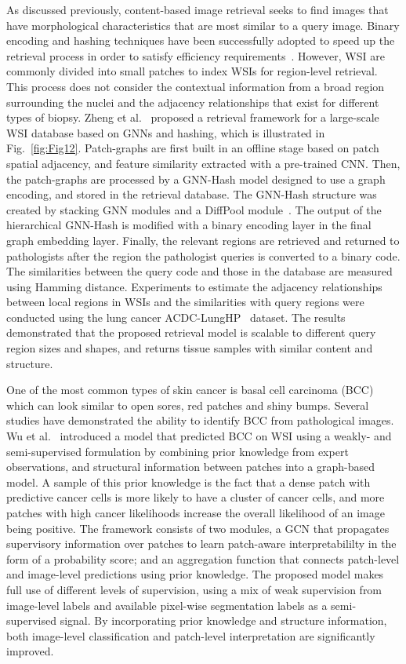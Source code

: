 As discussed previously, content-based image retrieval seeks to find images that have morphological characteristics that are most similar to a query image.
Binary encoding and hashing techniques have been successfully adopted to speed up the retrieval process in order to satisfy efficiency requirements~. However, WSI are commonly divided into small patches to index WSIs for region-level retrieval. This process does not consider the contextual information from a broad region surrounding the nuclei and the adjacency relationships that exist for different types of biopsy.
Zheng et al.~ proposed a retrieval framework for a large-scale WSI database based on GNNs and hashing, which is illustrated in Fig.~\ref{fig:Fig12}.
Patch-graphs are first built in an offline stage based on patch spatial adjacency, and feature similarity extracted with a pre-trained CNN. Then, the patch-graphs are processed by a GNN-Hash model designed to use a graph encoding, and stored in the retrieval database. The GNN-Hash structure was created by stacking GNN modules and a DiffPool module~. The output of the hierarchical GNN-Hash is modified with a binary encoding layer in the final graph embedding layer. Finally, the relevant regions are retrieved and returned to pathologists after the region the pathologist queries is converted to a binary code. The similarities between the query code and those in the database are measured using Hamming distance.
Experiments to estimate the adjacency relationships between local regions in WSIs and the similarities with query regions were conducted using the lung cancer ACDC-LungHP~ dataset.
The results demonstrated that the proposed retrieval model is scalable to different query region sizes and shapes, and returns tissue samples with similar content and structure.

One of the most common types of skin cancer is basal cell carcinoma (BCC) which can look similar to open sores, red patches and shiny bumps. Several studies have demonstrated the ability to identify BCC from pathological images. 
Wu et al.~ introduced a model that predicted BCC on WSI using a weakly- and semi-supervised formulation by combining prior knowledge from expert observations, and structural information between patches into a graph-based model. A sample of this prior knowledge is the fact that a dense patch with predictive cancer cells is more likely to have a cluster of cancer cells, and more patches with high cancer likelihoods increase the overall likelihood of an image being positive.
The framework consists of two modules, a GCN that propagates supervisory information over patches to learn patch-aware interpretabililty in the form of a probability score; and an aggregation function that connects patch-level and image-level predictions using prior knowledge. 
The proposed model makes full use of different levels of supervision, using a mix of weak supervision from image-level labels and  available pixel-wise segmentation labels as a semi-supervised signal.
By incorporating prior knowledge and structure information, both image-level classification and patch-level interpretation are significantly improved.

